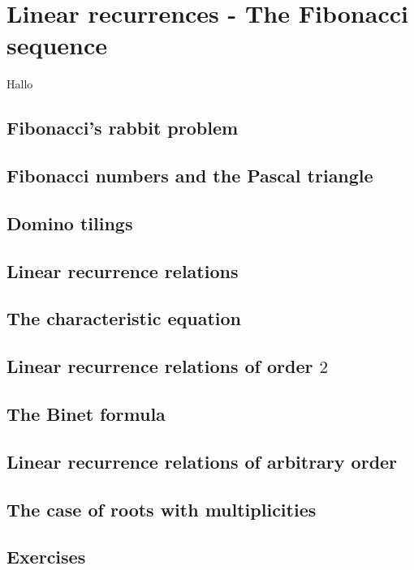 \section{Linear recurrences - The Fibonacci sequence}\label{fibonacci} 

Hallo

\subsection{Fibonacci's rabbit problem}

\subsection{Fibonacci numbers and the Pascal triangle}

\subsection{Domino tilings}

\subsection{Linear recurrence relations}

\subsection{The characteristic equation}

\subsection{Linear recurrence relations of order $2$}

\subsection{The Binet formula}

\subsection{Linear recurrence relations of arbitrary order}

\subsection{The case of roots with multiplicities}

\subsection{Exercises}